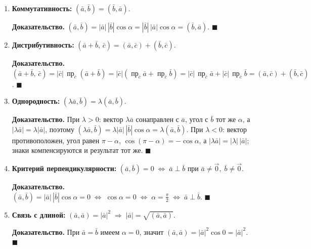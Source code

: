\documentclass[12pt,a4paper]{article}
\newenvironment{myproof}{\noindent\textbf{Доказательство.}}{\hfill$\blacksquare$}
\newcommand{\va}{\bar{a}}
\newcommand{\vb}{\bar{b}}
\newcommand{\vc}{\bar{c}}
\begin{document}
\begin{enumerate}
  \item \textbf{Коммутативность:} $(\va,\vb) = (\vb,\va)$.

    \begin{myproof}
      $(\va,\vb) = |\va|\,|\vb|\cos\alpha = |\vb|\,|\va|\cos\alpha =
      (\vb,\va)$.\hfill
    \end{myproof}

  \item \textbf{Дистрибутивность:}
    $(\va + \vb,\,\vc) = (\va,\vc) + (\vb,\vc)$.

    \begin{myproof}
      $(\va + \vb,\,\vc) = |\vc|\,\operatorname{пр}_{\vc}(\va + \vb)
      = |\vc|\!\left(\operatorname{пр}_{\vc}\va +
      \operatorname{пр}_{\vc}\vb\right) =
      |\vc|\,\operatorname{пр}_{\vc}\va +
      |\vc|\,\operatorname{пр}_{\vc}\vb = (\va,\vc) + (\vb,\vc)$.
    \end{myproof}

  \item \textbf{Однородность:} $(\lambda\va,\vb) = \lambda(\va,\vb)$.

    \begin{myproof}
      При $\lambda>0$: вектор $\lambda\va$ сонаправлен с $\va$, угол
      с $\vb$ тот же $\alpha$, а $|\lambda\va|=\lambda|\va|$, поэтому
      $(\lambda\va,\vb)=\lambda|\va|\,|\vb|\cos\alpha=\lambda(\va,\vb)$.
      При $\lambda<0$: вектор противоположен, угол равен $\pi-\alpha$,
      $\cos(\pi-\alpha)=-\cos\alpha$, а $|\lambda\va|=|\lambda|\,|\va|$;
      знаки компенсируются и результат тот же.
    \end{myproof}

  \item \textbf{Критерий перпендикулярности:}
    $(\va,\vb) = 0 \;\Leftrightarrow\; \va \perp \vb$
    при $\va \neq \vec{0},\; \vb \neq \vec{0}$.

    \begin{myproof}
      $(\va,\vb)=|\va|\,|\vb|\cos\alpha=0
      \;\Leftrightarrow\;\cos\alpha=0
      \;\Leftrightarrow\;\alpha=\tfrac{\pi}{2}
      \;\Leftrightarrow\;\va\perp\vb$.
    \end{myproof}

  \item \textbf{Связь с длиной:}
    $(\va,\va) = |\va|^2 \;\Rightarrow\; |\va| = \sqrt{(\va,\va)}$.

    \begin{myproof}
      При $\va=\vb$ имеем $\alpha=0$, значит
      $(\va,\va)=|\va|^2\cos 0=|\va|^2$.
    \end{myproof}
\end{enumerate}
\end{document}
